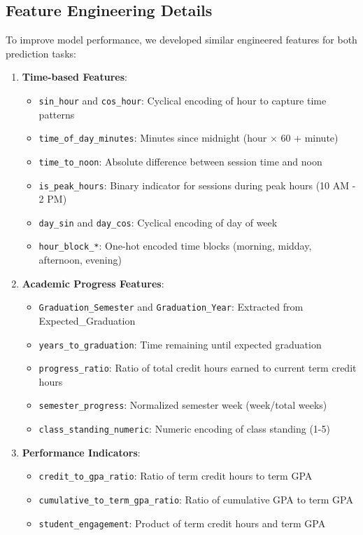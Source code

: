 \documentclass[12pt,letterpaper]{article}
\begin{document}
\subsection{Feature Engineering Details}

To improve model performance, we developed similar engineered features for both prediction tasks:

\begin{enumerate}
    \item \textbf{Time-based Features}:
    \begin{itemize}
        \item \texttt{sin\_hour} and \texttt{cos\_hour}: Cyclical encoding of hour to capture time patterns
        \item \texttt{time\_of\_day\_minutes}: Minutes since midnight (hour × 60 + minute)
        \item \texttt{time\_to\_noon}: Absolute difference between session time and noon
        \item \texttt{is\_peak\_hours}: Binary indicator for sessions during peak hours (10 AM - 2 PM)
        \item \texttt{day\_sin} and \texttt{day\_cos}: Cyclical encoding of day of week
        \item \texttt{hour\_block\_*}: One-hot encoded time blocks (morning, midday, afternoon, evening)
    \end{itemize}

    \item \textbf{Academic Progress Features}:
    \begin{itemize}
        \item \texttt{Graduation\_Semester} and \texttt{Graduation\_Year}: Extracted from Expected\_Graduation
        \item \texttt{years\_to\_graduation}: Time remaining until expected graduation
        \item \texttt{progress\_ratio}: Ratio of total credit hours earned to current term credit hours
        \item \texttt{semester\_progress}: Normalized semester week (week/total weeks)
        \item \texttt{class\_standing\_numeric}: Numeric encoding of class standing (1-5)
    \end{itemize}

    \item \textbf{Performance Indicators}:
    \begin{itemize}
        \item \texttt{credit\_to\_gpa\_ratio}: Ratio of term credit hours to term GPA
        \item \texttt{cumulative\_to\_term\_gpa\_ratio}: Ratio of cumulative GPA to term GPA
        \item \texttt{student\_engagement}: Product of term credit hours and term GPA
    \end{itemize}


\end{enumerate}
\end{document}

